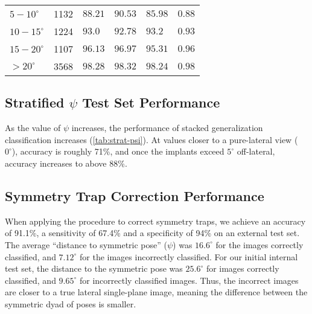 {\begin{landscape}
\begin{table}[h]
\begin{tabularx}{1.0\linewidth}{XXXXXX}
			$5-10^{{\circ}}$ & 1132        & $88.21$       & $90.53$          & $85.98$          & $0.88$   \\
			$10-15^{\circ}$  & 1224        & $93.0$        & $92.78$          & $93.2$           & $0.93$   \\
			$15-20^{\circ}$  & 1107        & $96.13$       & $96.97$          & $95.31$          & $0.96$   \\
			$>20^{\circ}$    & 3568        & $98.28$       & $98.32$          & $98.24$          & $0.98$   \\
			\hline
		\end{tabularx}
	\end{table}
\end{landscape}

\subsection{Stratified $\psi$ Test Set Performance}
As the value of $\psi$ increases, the performance of stacked generalization classification increases (\cref{tab:strat-psi}).
At values closer to a pure-lateral view (~$0^{\circ}$), accuracy is roughly 71\%, and once the implants exceed $5^{\circ}$ off-lateral, accuracy increases to above 88\%.



\subsection{Symmetry Trap Correction Performance}
When applying the procedure to correct symmetry traps, we achieve an accuracy of 91.1\%, a sensitivity of 67.4\% and a specificity of 94\% on an external test set.
The average “distance to symmetric pose” ($\psi$) was $16.6^{\circ}$ for the images correctly classified, and $7.12^{\circ}$ for the images incorrectly classified.
For our initial internal test set, the distance to the symmetric pose was $25.6^{\circ}$ for images correctly classified, and $9.65^{\circ}$ for incorrectly classified images.
Thus, the incorrect images are closer to a true lateral single-plane image, meaning the difference between the symmetric dyad of poses is smaller.

}
